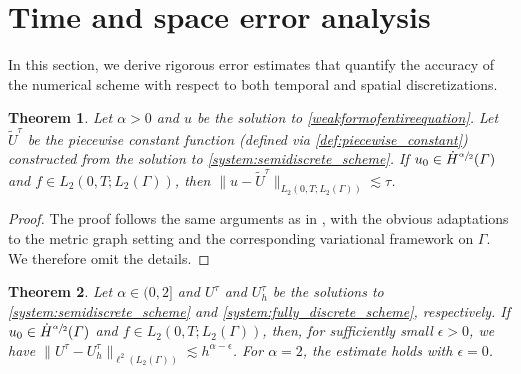 \documentclass[numbers,webpdf]{ima-authoring-template}%
\theoremstyle{thmstyletwo}%
\newtheorem{theorem}{Theorem}%
\numberwithin{equation}{section}
\begin{document}
\section{Time and space error analysis}
\label{timeandspaceerroranalysis}
In this section, we derive rigorous error estimates that quantify the accuracy of the numerical scheme with respect to both temporal and spatial discretizations.
\begin{theorem}
\label{theorem:first_part_of_main}
    Let $\alpha>0$ and $u$ be the solution to \eqref{weakformofentireequation}. Let $\tilde{U}^\tau$ be the piecewise constant function (defined via \eqref{def:piecewise_constant}) constructed from the solution to \eqref{system:semidiscrete_scheme}. If $u_0\in\dot{H}^{\sfrac{\alpha}{2}}({\mit\varGamma})$ and $f\in L_2(0,T;L_2(\Gamma))$, then $\|u-\tilde{U}^\tau\|_{L_2(0,T;L_2(\Gamma))}\lesssim \tau$.
\end{theorem}
\begin{proof}
The proof follows the same arguments as in \cite[Theorem~5.6]{Glusa2021errorestimates}, with the obvious adaptations to the metric graph setting and the corresponding variational framework on $\Gamma$. We therefore omit the details.
\hfill
\end{proof}
\begin{theorem}
\label{theorem:theorem_second_part_of_main}
Let $\alpha\in(0,2]$ and $U^\tau$ and $U_h^\tau$ be the solutions to \eqref{system:semidiscrete_scheme} and \eqref{system:fully_discrete_scheme}, respectively. If $u_0\in\dot{H}^{\sfrac{\alpha}{2}}({\mit\varGamma})$ and $f\in L_2(0,T;L_2(\Gamma))$, then, for sufficiently small $\epsilon>0$, we have $\|U^\tau-U_h^\tau\|_{\ell^2(L_2(\Gamma))}\lesssim h^{\alpha-\epsilon}$. For $\alpha=2$, the estimate holds with $\epsilon=0$.
\end{theorem}
\end{document}
